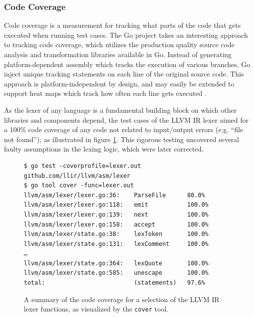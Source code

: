 
\subsubsection{Code Coverage}
\label{sec:ver_code_coverage}

Code coverage is a measurement for tracking what parts of the code that gets executed when running test cases. The Go project takes an interesting approach to tracking code coverage, which utilizes the production quality source code analysis and transformation libraries available in Go. Instead of generating platform-dependent assembly which tracks the execution of various branches, Go inject unique tracking statements on each line of the original source code. This approach is platform-independent by design, and may easily be extended to support heat maps which track how often each line gets executed \cite{go_cover}.

As the lexer of any language is a fundamental building block on which other libraries and components depend, the test cases of the LLVM IR lexer aimed for a 100\% code coverage of any code not related to input/output errors (e.g. ``file not found''); as illustrated in figure \ref{fig:lexer_code_coverage}. This rigorous testing uncovered several faulty assumptions in the lexing logic, which were later corrected.

\begin{figure}[htbp]
	\begin{center}
		\begin{verbatim}
$ go test -coverprofile=lexer.out github.com/llir/llvm/asm/lexer
$ go tool cover -func=lexer.out
llvm/asm/lexer/lexer.go:36:    ParseFile      80.0%
llvm/asm/lexer/lexer.go:118:   emit           100.0%
llvm/asm/lexer/lexer.go:139:   next           100.0%
llvm/asm/lexer/lexer.go:158:   accept         100.0%
llvm/asm/lexer/state.go:38:    lexToken       100.0%
llvm/asm/lexer/state.go:131:   lexComment     100.0%
…
llvm/asm/lexer/state.go:364:   lexQuote       100.0%
llvm/asm/lexer/state.go:585:   unescape       100.0%
total:                         (statements)   97.6%
		\end{verbatim}
		\caption{A summary of the code coverage for a selection of the LLVM IR lexer functions, as visualized by the \texttt{cover} tool.}
		\label{fig:lexer_code_coverage}
	\end{center}
\end{figure}

